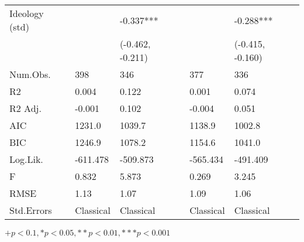 \begin{table}[th!]
\begin{threeparttable}
\begin{tabular}{lC{3cm}C{3cm}C{3cm}C{3cm}}
 Ideology (std) &                 &               -0.337*** &                 &                -0.288*** \\
                &                 &        (-0.462, -0.211) &                 &         (-0.415, -0.160) \\
       Num.Obs. &             398 &                     346 &             377 &                      336 \\
             R2 &           0.004 &                   0.122 &           0.001 &                    0.074 \\
        R2 Adj. &          -0.001 &                   0.102 &          -0.004 &                    0.051 \\
            AIC &          1231.0 &                  1039.7 &          1138.9 &                   1002.8 \\
            BIC &          1246.9 &                  1078.2 &          1154.6 &                   1041.0 \\
       Log.Lik. &        -611.478 &                -509.873 &        -565.434 &                 -491.409 \\
              F &           0.832 &                   5.873 &           0.269 &                    3.245 \\
           RMSE &            1.13 &                    1.07 &            1.09 &                     1.06 \\
     Std.Errors &       Classical &               Classical &       Classical &                Classical \\
\bottomrule
\end{tabular}
\begin{tablenotes}
\item \footnotesize $+ p < 0.1, * p < 0.05, ** p < 0.01, *** p < 0.001$
\end{tablenotes}
\end{threeparttable}
\end{table}
